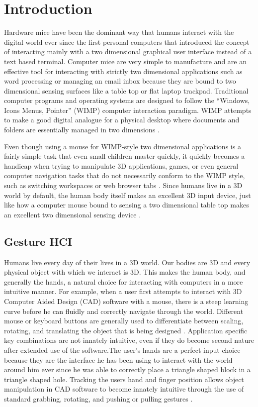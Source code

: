 \chapter{Introduction}
Hardware mice have been the dominant way that humans interact with the digital world ever since the first personal computers that introduced the concept of interacting mainly with a two dimensional graphical user interface instead of a text based terminal. Computer mice are very simple to manufacture and are an effective tool for interacting with strictly two dimensional applications such as word processing or managing an email inbox because they are bound to two dimensional sensing surfaces like a table top or flat laptop trackpad. Traditional computer programs and operating systems are designed to follow the “Windows, Icons Menus, Pointer” (WIMP) computer interaction paradigm. WIMP attempts to make a good digital analogue for a physical desktop where documents and folders are essentially managed in two dimensions \cite{hinckley2002input}.

Even though using a mouse for WIMP-style two dimensional applications is a fairly simple task that even small children master quickly, it quickly becomes a handicap when trying to manipulate 3D applications, games, or even general computer navigation tasks that do not necessarily conform to the WIMP style, such as switching workspaces or web browser tabs \cite{krueger1991artificial}. Since humans live in a 3D world by default, the human body itself makes an excellent 3D input device, just like how a computer mouse bound to sensing a two dimensional table top makes an excellent two dimensional sensing device \cite{wren1996pfinder}.

\section{Gesture HCI}

Humans live every day of their lives in a 3D world. Our bodies are 3D and every physical object with which we interact is 3D. This makes the human body, and generally the hands, a natural choice for interacting with computers in a more intuitive manner. For example, when a user first attempts to interact with 3D Computer Aided Design (CAD) software with a mouse, there is a steep learning curve before he can fluidly and correctly navigate through the world. Different mouse or keyboard buttons are generally used to differentiate between scaling, rotating, and translating the object that is being designed \cite{hamade2007evaluating}. Application specific key combinations are not innately intuitive, even if they do become second nature after extended use of the software.The user’s hands are a perfect input choice because they are the interface he has been using to interact with the world around him ever since he was able to correctly place a triangle shaped block in a triangle shaped hole. Tracking the users hand and finger position allows object manipulation in CAD software to become innately intuitive through the use of standard grabbing, rotating, and pushing or pulling gestures \cite{nam1996recognition}.

